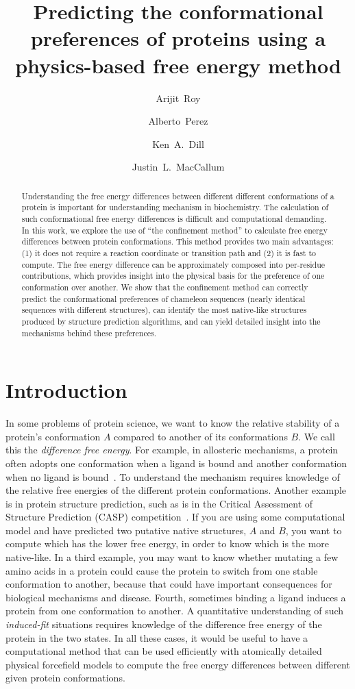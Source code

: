 \documentclass[12pt]{article}
\author{Arijit~Roy}
\author{Alberto~Perez}
\author{Ken~A.~Dill}
\author{Justin~L.~MacCallum}
\affil{Laufer Center for Physical and Quantitative Biology\\
    and Departments of Physics and Chemistry\\
    Stony Brook University\\
    Stony Brook, NY 11794-5252.}
\title{Predicting the conformational preferences of proteins using a physics-based free energy
method}
\begin{document}
\maketitle

\begin{abstract}


Understanding the free energy differences between different different conformations of a protein is important for
understanding mechanism in biochemistry. The calculation of such conformational free energy differences is difficult and
computational demanding. In this work, we explore the use of ``the confinement method'' to calculate free energy
differences between protein conformations. This method provides two main advantages: (1) it does not require a reaction
coordinate or transition path and (2) it is fast to compute. The free energy difference can be approximately composed
into per-residue contributions, which provides insight into the physical basis for the preference of one conformation
over another. We show that the confinement method can correctly predict the conformational preferences of chameleon
sequences (nearly identical sequences with different structures), can identify the most native-like structures produced
by structure prediction algorithms, and can yield detailed insight into the mechanisms behind these preferences.

\end{abstract}

\section*{Introduction}

In some problems of protein science, we want to know the relative stability of a protein's conformation $A$ compared to
another of its conformations $B$. We call this the \emph{difference free energy}. For example, in allosteric mechanisms,
a protein often adopts one conformation when a ligand is bound and another conformation when no ligand is
bound~\cite{Elber2007}. To understand the mechanism requires knowledge of the relative free energies of the different
protein conformations.  Another example is in protein structure prediction, such as is in the Critical Assessment of
Structure Prediction (CASP) competition~\cite{Moult2011}. If you are using some computational model and have predicted
two putative native structures, $A$ and $B$, you want to compute which has the lower free energy, in order to know which
is the more native-like.  In a third example, you may want to know whether mutating a few amino acids in a protein could
cause the protein to switch from one stable conformation to another, because that could have important consequences for
biological mechanisms and disease. Fourth, sometimes binding a ligand induces a protein from one conformation to
another. A quantitative understanding of such \emph{induced-fit} situations requires knowledge of the difference free
energy of the protein in the two states. In all these cases, it would be useful to have a computational method that can
be used efficiently with atomically detailed physical forcefield models to compute the free energy differences between
different given protein conformations.
\end{document}
